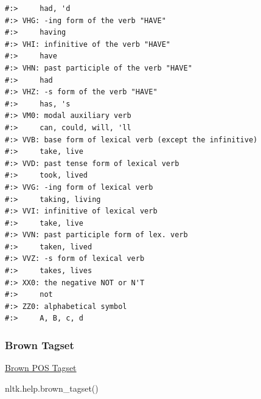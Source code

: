 \documentclass[
]{book}
\newenvironment{Shaded}{\begin{snugshade}}{\end{snugshade}}
\newcommand{\BuiltInTok}[1]{#1}
\newcommand{\NormalTok}[1]{#1}
\begin{document}
\begin{verbatim}
#:>     had, 'd
#:> VHG: -ing form of the verb "HAVE"
#:>     having
#:> VHI: infinitive of the verb "HAVE"
#:>     have
#:> VHN: past participle of the verb "HAVE"
#:>     had
#:> VHZ: -s form of the verb "HAVE"
#:>     has, 's
#:> VM0: modal auxiliary verb
#:>     can, could, will, 'll
#:> VVB: base form of lexical verb (except the infinitive)
#:>     take, live
#:> VVD: past tense form of lexical verb
#:>     took, lived
#:> VVG: -ing form of lexical verb
#:>     taking, living
#:> VVI: infinitive of lexical verb
#:>     take, live
#:> VVN: past participle form of lex. verb
#:>     taken, lived
#:> VVZ: -s form of lexical verb
#:>     takes, lives
#:> XX0: the negative NOT or N'T
#:>     not
#:> ZZ0: alphabetical symbol
#:>     A, B, c, d
\end{verbatim}

\hypertarget{brown-tagset}{%
\subsubsection{Brown Tagset}\label{brown-tagset}}

\href{https://en.wikipedia.org/wiki/Brown_Corpus\#Part-of-speech_tags_used}{Brown POS Tagset}

\begin{Shaded}
\begin{Highlighting}[]
\NormalTok{nltk.}\BuiltInTok{help}\NormalTok{.brown_tagset()}
\end{Highlighting}
\end{Shaded}
\end{document}
